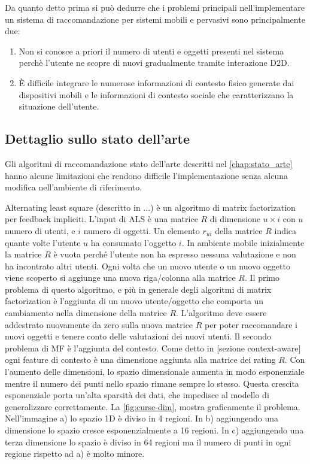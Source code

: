 Da quanto detto prima si può dedurre che i problemi principali nell'implementare un sistema di raccomandazione per sistemi mobili e pervasivi sono principalmente due:
\begin{enumerate}
 \item Non si conosce a priori il numero di utenti e oggetti presenti nel sistema perchè l'utente ne scopre di nuovi gradualmente tramite interazione D2D.
 \item \`E difficile integrare le numerose informazioni di contesto fisico generate dai dispositivi mobili e le informazioni di contesto sociale che caratterizzano la situazione dell'utente.
\end{enumerate}

\subsection{Dettaglio sullo stato dell'arte}
Gli algoritmi di raccomandazione stato dell'arte descritti nel \autoref{chap:stato_arte} hanno alcune limitazioni che rendono difficile l'implementazione senza alcuna modifica nell'ambiente di riferimento.

Alternating least square (descritto in ...) è un algoritmo di matrix factorization per feedback impliciti. L'input di ALS è una matrice $R$ di dimensione $u \times i$ con $u$ numero di utenti, e $i$ numero di oggetti. Un elemento $r_{ui}$ della matrice $R$ indica quante volte l'utente $u$ ha consumato l'oggetto $i$. In ambiente mobile inizialmente la matrice $R$ è vuota perché l'utente non ha espresso nessuna valutazione e non ha incontrato altri utenti. Ogni volta che un nuovo utente o un nuovo oggetto viene scoperto si aggiunge una nuova riga/colonna alla matrice $R$. Il primo problema di questo algoritmo, e più in generale degli algoritmi di matrix factorization è l'aggiunta di un nuovo utente/oggetto che comporta un cambiamento nella dimensione della matrice $R$. L'algoritmo deve essere addestrato nuovamente da zero sulla nuova matrice $R$ per poter raccomandare i nuovi oggetti e tenere conto delle valutazioni dei nuovi utenti. Il secondo problema di MF è l'aggiunta del contesto. Come detto in [sezione context-aware] ogni feature di contesto è una dimensione aggiunta alla matrice dei rating $R$. Con l'aumento delle dimensioni, lo spazio dimensionale aumenta in modo esponenziale \cite{curse-of-dim} mentre il numero dei punti nello spazio rimane sempre lo stesso. Questa crescita esponenziale porta un'alta sparsità dei dati, che impedisce al modello di generalizzare correttamente. La \autoref{fig:curse-dim}, mostra graficamente il problema. Nell'immagine a) lo spazio 1D è diviso in 4 regioni. In b) aggiungendo una dimensione lo spazio cresce esponenzialmente a 16 regioni. In c) aggiungendo una terza dimensione lo spazio è diviso in 64 regioni ma il numero di punti in ogni regione rispetto ad a) è molto minore.

